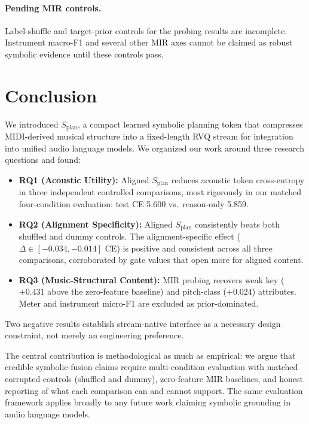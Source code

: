 \documentclass[11pt]{article}
\newcommand{\splan}{$S_{\mathrm{plan}}$}
\begin{document}
\paragraph{Pending MIR controls.}
Label-shuffle and target-prior controls for the probing results are incomplete.
Instrument macro-F1 and several other MIR axes cannot be claimed as robust symbolic
evidence until these controls pass.

\section{Conclusion}

We introduced \splan{}, a compact learned symbolic planning token that compresses
MIDI-derived musical structure into a fixed-length RVQ stream for integration into
unified audio language models.  We organized our work around three research questions
and found:

\begin{itemize}
  \item \textbf{RQ1 (Acoustic Utility):} Aligned \splan{} reduces acoustic token
    cross-entropy in three independent controlled comparisons, most rigorously in our
    matched four-condition evaluation: test CE 5.600 vs.\ reason-only 5.859.
  \item \textbf{RQ2 (Alignment Specificity):} Aligned \splan{} consistently beats
    both shuffled and dummy controls.  The alignment-specific effect
    ($\Delta\in[-0.034,-0.014]$ CE) is positive and consistent across all three
    comparisons, corroborated by gate values that open more for aligned content.
  \item \textbf{RQ3 (Music-Structural Content):} MIR probing recovers weak key
    ($+0.431$ above the zero-feature baseline) and pitch-class ($+0.024$) attributes.
    Meter and instrument micro-F1 are excluded as prior-dominated.
\end{itemize}

Two negative results establish stream-native interface as a necessary design constraint,
not merely an engineering preference.

The central contribution is methodological as much as empirical: we argue that
credible symbolic-fusion claims require multi-condition evaluation with matched
corrupted controls (shuffled and dummy), zero-feature MIR baselines, and honest
reporting of what each comparison can and cannot support.  The same evaluation
framework applies broadly to any future work claiming symbolic grounding in audio
language models.
\end{document}
